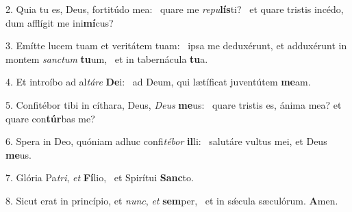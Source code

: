 2. Quia tu es, Deus, fortitúdo mea: \dag\  quare me \textit{re}\textit{pu}\textbf{lís}ti? \ast\  et quare tristis incédo, dum afflígit me ini\textbf{mí}cus?\

3. Emítte lucem tuam et veritátem tuam: \dag\  ipsa me deduxérunt, et adduxérunt in montem \textit{sanc}\textit{tum} \textbf{tu}um, \ast\  et in tabernácula \textbf{tu}a.\

4. Et introíbo ad al\textit{tá}\textit{re} \textbf{De}i: \ast\  ad Deum, qui lætíficat juventútem \textbf{me}am.\

5. Confitébor tibi in cíthara, Deus, \textit{De}\textit{us} \textbf{me}us: \ast\  quare tristis es, ánima mea? et quare con\textbf{túr}bas me?\

6. Spera in Deo, quóniam adhuc confi\textit{té}\textit{bor} \textbf{il}li: \ast\  salutáre vultus mei, et Deus \textbf{me}us.\

7. Glória Pa\textit{tri}, \textit{et} \textbf{Fí}lio, \ast\  et Spirítui \textbf{Sanc}to.\

8. Sicut erat in princípio, et \textit{nunc}, \textit{et} \textbf{sem}per, \ast\  et in sǽcula sæculórum. \textbf{A}men.\

